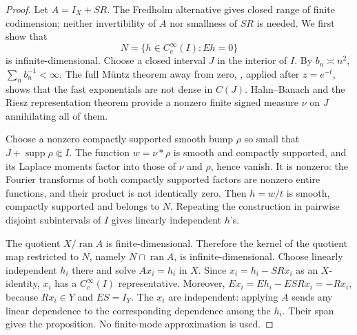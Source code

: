 \begin{proof}
Let \(A=I_X+SR\). The Fredholm alternative \cite{Howard2020} gives closed range of finite codimension; neither invertibility of \(A\) nor smallness of \(SR\) is needed. We first show that
\[
N=\{h\in C_c^\infty(I):Eh=0\}
\]
is infinite-dimensional. Choose a closed interval \(J\) in the interior of \(I\). By \(b_n\asymp n^2\), \(\sum_n b_n^{-1}<\infty\). The full M\"untz theorem away from zero, \cite[Theorem~29]{Almira2007}, applied after \(z=e^{-t}\), shows that the fast exponentials are not dense in \(C(J)\). Hahn--Banach and the Riesz representation theorem \cite{RieszNotes} provide a nonzero finite signed measure \(\nu\) on \(J\) annihilating all of them.

Choose a nonzero compactly supported smooth bump \(\rho\) so small that \(J+\operatorname{supp}\rho\Subset I\). The function \(w=\nu*\rho\) is smooth and compactly supported, and its Laplace moments factor into those of \(\nu\) and \(\rho\), hence vanish. It is nonzero: the Fourier transforms of both compactly supported factors are nonzero entire functions, and their product is not identically zero. Then \(h=w/t\) is smooth, compactly supported and belongs to \(N\). Repeating the construction in pairwise disjoint subintervals of \(I\) gives linearly independent \(h\)'s.

The quotient \(X/\operatorname{ran}A\) is finite-dimensional. Therefore the kernel of the quotient map restricted to \(N\), namely \(N\cap\operatorname{ran}A\), is infinite-dimensional. Choose linearly independent \(h_i\) there and solve \(Ax_i=h_i\) in \(X\). Since \(x_i=h_i-SRx_i\) as an \(X\)-identity, \(x_i\) has a \(C_c^\infty(I)\) representative. Moreover, \(Ex_i=Eh_i-ESRx_i=-Rx_i\), because \(Rx_i\in Y\) and \(ES=I_Y\). The \(x_i\) are independent: applying \(A\) sends any linear dependence to the corresponding dependence among the \(h_i\). Their span gives the proposition. No finite-mode approximation is used.
\end{proof}
